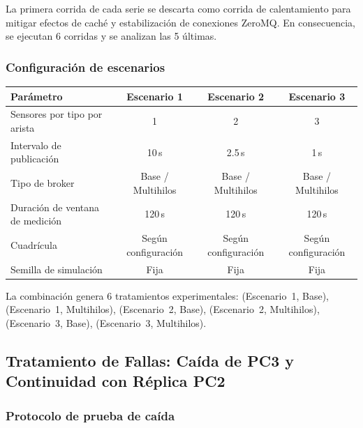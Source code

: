 \documentclass[12pt, a4paper]{article}
\begin{document}
La primera corrida de cada serie se descarta como corrida de calentamiento para mitigar efectos de caché y estabilización de conexiones ZeroMQ. En consecuencia, se ejecutan 6 corridas y se analizan las 5 últimas.

\subsubsection{Configuración de escenarios}

\begin{center}
\footnotesize
\renewcommand{\arraystretch}{1.2}
\setlength{\tabcolsep}{4pt}

\begin{tabular}{|L{4.5cm}|c|c|c|}
\hline
\textbf{Parámetro} & \textbf{Escenario 1} & \textbf{Escenario 2} & \textbf{Escenario 3} \\
\hline
Sensores por tipo por arista & 1 & 2 & 3 \\
Intervalo de publicación & 10\,s & 2.5\,s & 1\,s \\
Tipo de broker & Base / Multihilos & Base / Multihilos & Base / Multihilos \\
Duración de ventana de medición & 120\,s & 120\,s & 120\,s \\
Cuadrícula & Según configuración & Según configuración & Según configuración \\
Semilla de simulación & Fija & Fija & Fija \\
\hline
\end{tabular}
\end{center}
La combinación genera 6 tratamientos experimentales: (Escenario~1, Base), (Escenario~1, Multihilos), (Escenario~2, Base), (Escenario~2, Multihilos), (Escenario~3, Base), (Escenario~3, Multihilos).

\subsection{Tratamiento de Fallas: Caída de PC3 y Continuidad con Réplica PC2}

\subsubsection{Protocolo de prueba de caída}
\end{document}
